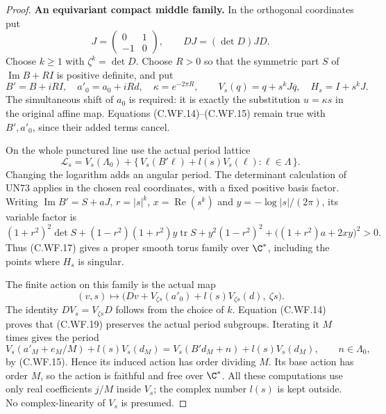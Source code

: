 \begin{proof}
\par\medskip\noindent\textbf{An equivariant compact middle family.}
In the orthogonal coordinates put
\[
 J=\begin{pmatrix}0&1\\-1&0\end{pmatrix},\qquad
 DJ=(\det D)JD.
\]
Choose \(k\ge1\) with \(\zeta^k=\det D\).
Choose \(R>0\) so that the symmetric part \(S\) of
\(\operatorname{Im}B+RI\) is positive definite, and put
\[
 B'=B+iRI,\quad a'_0=a_0+iRd,\quad
 \kappa=e^{-2\pi R},\qquad
 V_s(q)=q+s^kJ\overline q,\quad H_s=I+s^kJ.
\tag{C.WF.16}
\]
The simultaneous shift of \(a_0\) is required: it is
exactly the substitution \(u=\kappa s\) in the original
affine map.  Equations (C.WF.14)--(C.WF.15) remain true
with \(B',a'_0\), since their added terms cancel.

On the whole punctured line use the actual period lattice
\[
 \mathcal L_s=V_s(\Lambda_0)+
       \{\,V_s(B'\ell)+l(s)V_s(\ell):\ell\in\Lambda\,\}.
\tag{C.WF.17}
\]
Changing the logarithm adds an angular period.  The
determinant calculation of UN73 applies in the chosen
real coordinates, with a fixed positive basis factor.
Writing \(\operatorname{Im}B'=S+aJ\),
\(r=|s|^k\), \(x=\operatorname{Re}(s^k)\) and
\(y=-\log|s|/(2\pi)\), its variable factor is
\[
 (1+r^2)^2\det S+(1-r^2)(1+r^2)y\operatorname{tr}S
 +y^2(1-r^2)^2+\bigl((1+r^2)a+2xy\bigr)^2>0 .
\tag{C.WF.18}
\]
Thus (C.WF.17) gives a proper smooth torus family over
\(\C^*\), including the points where \(H_s\) is singular.

The finite action on this family is the actual map
\[
 (v,s)\longmapsto
 \bigl(Dv+V_{\zeta s}(a'_0)
                  +l(s)V_{\zeta s}(d),\ \zeta s\bigr).
\tag{C.WF.19}
\]
The identity \(DV_s=V_{\zeta s}D\) follows from the
choice of \(k\).  Equation (C.WF.14) proves that
(C.WF.19) preserves the actual period subgroups.
Iterating it \(M\) times gives the period
\[
 V_s(a'_M+e_M/M)+l(s)V_s(d_M)
       =V_s(B'd_M+n)+l(s)V_s(d_M),\qquad n\in\Lambda_0,
\tag{C.WF.20}
\]
by (C.WF.15).  Hence its induced action has order
dividing \(M\).  Its base action has order \(M\), so
the action is faithful and free over \(\C^*\).
All these computations use only real coefficients
\(j/M\) inside \(V_s\); the complex number \(l(s)\)
is kept outside.  No complex-linearity of \(V_s\)
is presumed.


\end{proof}
